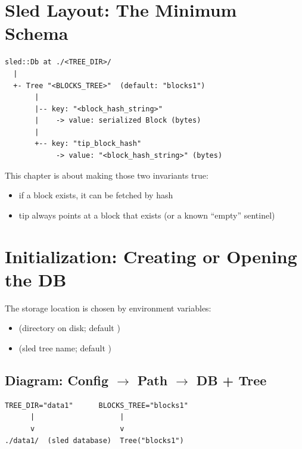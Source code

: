 \section{Sled Layout: The Minimum Schema}
\label{sec:ch11-sled-layout}

\begin{verbatim}
sled::Db at ./<TREE_DIR>/
  |
  +- Tree "<BLOCKS_TREE>"  (default: "blocks1")
       |
       |-- key: "<block_hash_string>"
       |    -> value: serialized Block (bytes)
       |
       +-- key: "tip_block_hash"
            -> value: "<block_hash_string>" (bytes)
\end{verbatim}

This chapter is about making those two invariants true:

\begin{itemize}
  \item if a block exists, it can be fetched by hash
  \item {}tip always points at a block that exists (or a known ``empty'' sentinel)
\end{itemize}

\section{Initialization: Creating or Opening the DB}
\label{sec:ch11-initialization}

The storage location is chosen by environment variables:

\begin{itemize}
  \item {} (directory on disk; default )
  \item {} (sled tree name; default )
\end{itemize}

\subsection{Diagram: Config $\to$ Path $\to$ DB + Tree}
\label{sec:ch11-config-diagram}

\begin{verbatim}
TREE_DIR="data1"      BLOCKS_TREE="blocks1"
      |                    |
      v                    v
./data1/  (sled database)  Tree("blocks1")
\end{verbatim}

